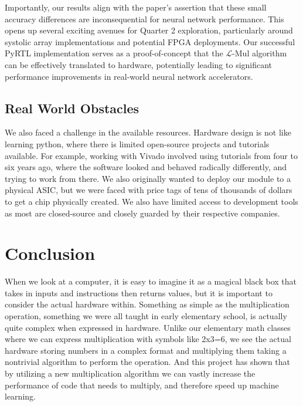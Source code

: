 \documentclass[12pt,letterpaper]{article}
\newcommand{\lmul}{$\mathcal{L}$-Mul\xspace}
\begin{document}
Importantly, our results align with the paper's assertion that these small accuracy differences are inconsequential for neural network performance. This opens up several exciting avenues for Quarter 2 exploration, particularly around systolic array implementations and potential FPGA deployments. Our successful PyRTL implementation serves as a proof-of-concept that the \lmul algorithm can be effectively translated to hardware, potentially leading to significant performance improvements in real-world neural network accelerators.


\subsection{Real World Obstacles}
We also faced a challenge in the available resources.  Hardware design is not like learning python, where there is limited open-source projects and tutorials available.  For example, working with Vivado involved using tutorials from four to six years ago, where the software looked and behaved radically differently, and trying to work from there.  We also originally wanted to deploy our module to a physical ASIC, but we were faced with price tags of tens of thousands of dollars to get a chip physically created.  We also have limited access to development tools as most are closed-source and closely guarded by their respective companies.



\section{Conclusion}

When we look at a computer, it is easy to imagine it as a magical black box that takes in inputs and instructions then returns values, but it is important to consider the actual hardware within.  Something as simple as the multiplication operation, something we were all taught in early elementary school, is actually quite complex when expressed in hardware.  Unlike our elementary math classes where we can express multiplication with symbols like 2x3=6, we see the actual hardware storing numbers in a complex format and multiplying them taking a nontrivial algorithm to perform the operation.  And this project has shown that by utilizing a new multiplication algorithm we can vastly increase the performance of code that needs to multiply, and therefore speed up machine learning.
\end{document}
